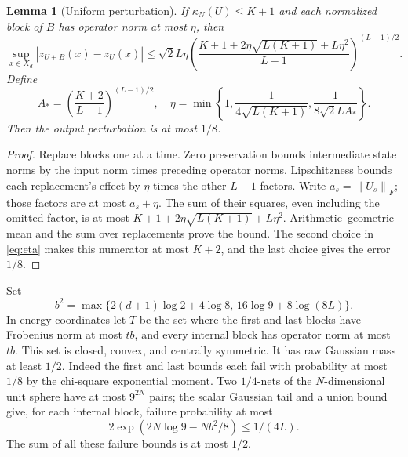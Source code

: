\documentclass[11pt]{article}
\newtheorem{lemma}[theorem]{Lemma}
\theoremstyle{remark}\newtheorem{remark}[theorem]{Remark}
\newcommand{\norm}[1]{\left\lVert#1\right\rVert}
\begin{document}
\begin{lemma}[Uniform perturbation]\label{lem:perturb}
If $\kappa_N(U)\le K+1$ and each normalized block of $B$ has
operator norm at most $\eta$, then
\[
 \sup_{x\in X_d}|z_{U+B}(x)-z_U(x)|
 \le\sqrt2L\eta
 \left(\frac{K+1+2\eta\sqrt{L(K+1)}+L\eta^2}{L-1}
                                                   \right)^{(L-1)/2}.
\]
Define
\begin{equation}\label{eq:eta}
 A_*=\left(\frac{K+2}{L-1}\right)^{(L-1)/2},\quad
 \eta=\min\left\{1,\frac1{4\sqrt{L(K+1)}},
                         \frac1{8\sqrt2LA_*}\right\}.
\end{equation}
Then the output perturbation is at most $1/8$.
\end{lemma}
\begin{proof}
Replace blocks one at a time. Zero preservation bounds intermediate
state norms by the input norm times preceding operator norms.
Lipschitzness bounds each replacement's effect by $\eta$ times
the other $L-1$ factors. Write $a_s=\norm{U_s}_F$; those factors
are at most $a_s+\eta$. The sum of their squares, even including
the omitted factor, is at most
$K+1+2\eta\sqrt{L(K+1)}+L\eta^2$. Arithmetic--geometric mean and
the sum over replacements prove the bound. The second choice in
\eqref{eq:eta} makes this numerator at most $K+2$, and the last
choice gives the error $1/8$.
\end{proof}

Set
\begin{equation}\label{eq:bulk}
 b^2=\max\{2(d+1)\log2+4\log8,\,
                          16\log9+8\log(8L)\}.
\end{equation}
In energy coordinates let $T$ be the set where the first and last
blocks have Frobenius norm at most $tb$, and every internal block
has operator norm at most $tb$. This set is closed, convex, and
centrally symmetric. It has raw Gaussian mass at least $1/2$.
Indeed the first and last bounds each fail with probability at
most $1/8$ by the chi-square exponential moment. Two $1/4$-nets
of the $N$-dimensional unit sphere have at most $9^{2N}$ pairs;
the scalar Gaussian tail and a union bound give, for each internal
block, failure probability at most
\[
 2\exp(2N\log9-Nb^2/8)\le1/(4L).
\]
The sum of all these failure bounds is at most $1/2$.
\end{document}
